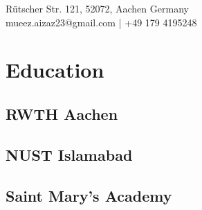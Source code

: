 \documentclass[letterpaper]{deedy-resume} %
\begin{document}

\lastupdated %

{ 
{Rütscher Str. 121, 52072, Aachen Germany} \\
{mueez.aizaz23@gmail.com} | +49 179 4195248
}


\begin{minipage}[t]{0.33\textwidth} %


\section{Education} 

\subsection{RWTH Aachen}


\sectionspace %

\subsection{NUST Islamabad}

\sectionspace %


\subsection{Saint Mary's Academy}

\sectionspace %


\end{minipage}
\end{document}
